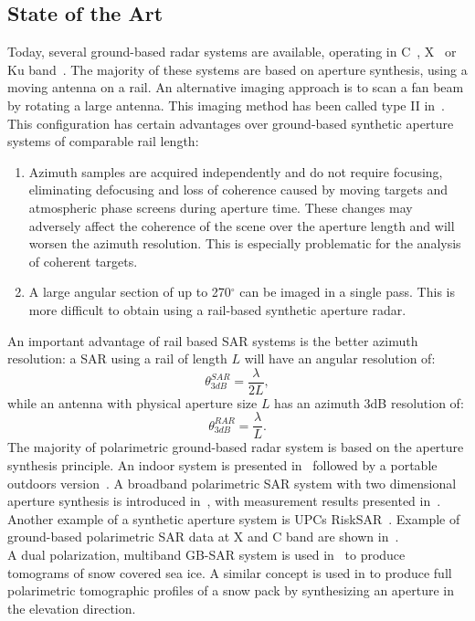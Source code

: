 \subsection{State of the Art}
Today, several ground-based radar systems are available, operating in C~\cite{Leva2003, Rudolf1999a,Kang2009}, X~\cite{Aguasca2004,Pipia2007a} or Ku band~\cite{Leva2003, Rudolf1999a,Werner2008, Rodelsperger2012}. The majority of these systems are based on aperture synthesis, using a moving antenna on a rail. 
An alternative imaging approach is to scan a fan beam by rotating a large antenna\cite{Werner2008,werner_gpri_2012}. This imaging method has been called type II in~\cite{Caduff2015}. 
This configuration has certain advantages over ground-based synthetic aperture systems\cite{Monserrat2014} of comparable rail length: \begin{enumerate}
  \item Azimuth samples are acquired independently and do not require focusing, eliminating defocusing and loss of coherence caused by moving targets and atmospheric phase screens during aperture time. 
These changes may adversely affect the coherence of the scene over the aperture length and will worsen the azimuth resolution. This is especially problematic for the analysis of coherent targets.\\
 \item A large 
angular section of up to 270$^{\circ}$ can be imaged in a single pass. This is more difficult to obtain using a rail-based synthetic aperture radar.\\
\end{enumerate}
An important advantage of rail based SAR systems is the better azimuth resolution: a SAR using a rail of length $L$ will have an angular resolution of: 
\begin{equation}
 	\theta_{3dB}^{SAR} = \frac{\lambda}{2L},
\end{equation}
while an antenna with physical aperture size $L$ has an azimuth 3dB resolution of:
\begin{equation}
 	\theta_{3dB}^{RAR} = \frac{\lambda}{L}.
\end{equation}
The majority of polarimetric ground-based radar system is based on the aperture synthesis principle. An indoor system is presented in~\cite{Bennett1996} followed by a portable outdoors version~\cite{Bennett2000}. A broadband polarimetric SAR system with two dimensional aperture synthesis is introduced in~\cite{Zhou2004}, with measurement results presented in~\cite{Hamasaki2005}.
Another example  of a synthetic aperture system is UPCs RiskSAR~\cite{Iglesias2014, Aguasca2004,Pipia2007a,Pipia2009, Pipia2013,Iglesias2014}. Example of ground-based polarimetric SAR data at X and C band are shown in~\cite{Kang2009, Kang2010}.\\ A dual polarization, multiband GB-SAR system is used in~\cite{Yitayew2014} to produce tomograms of snow covered sea ice. A similar concept is used in\cite{Frey2015,Frey2016} to produce full polarimetric tomographic profiles of a snow pack by synthesizing an aperture in the elevation direction.\\
